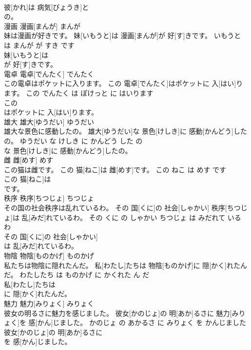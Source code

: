 \documentclass[8pt]{extreport}
\begin{document}
\begin{CJK}{UTF8}{min}
\\	彼[かれ]は 病気[びょうき]と
\\	の。			
\\	漫画	漫画[まんが]	まんが	
\\	妹は漫画が好きです。	妹[いもうと]は 漫画[まんが]が 好[す]きです。	いもうと は まんが が すき です	
\\	妹[いもうと]は
\\	が 好[す]きです。			
\\	電卓	電卓[でんたく]	でんたく	
\\	この電卓はポケットに入ります。	この 電卓[でんたく]はポケットに 入[はい]ります。	この でんたく は ぽけっと に はいります	
\\	この
\\	はポケットに 入[はい]ります。			
\\	雄大	雄大[ゆうだい]	ゆうだい	
\\	雄大な景色に感動したの。	雄大[ゆうだい]な 景色[けしき]に 感動[かんどう]したの。	ゆうだい な けしき に かんどう した の	
\\	な 景色[けしき]に 感動[かんどう]したの。			
\\	雌	雌[めす]	めす	
\\	この猫は雌です。	この 猫[ねこ]は 雌[めす]です。	この ねこ は めす です	
\\	この 猫[ねこ]は
\\	です。			
\\	秩序	秩序[ちつじょ]	ちつじょ	
\\	その国の社会秩序は乱れているわ。	その 国[くに]の 社会[しゃかい] 秩序[ちつじょ]は 乱[みだ]れているわ。	その くに の しゃかい ちつじょ は みだれて いる わ	
\\	その 国[くに]の 社会[しゃかい]
\\	は 乱[みだ]れているわ。			
\\	物陰	物陰[ものかげ]	ものかげ	
\\	私たちは物陰に隠れたんだ。	私[わたし]たちは 物陰[ものかげ]に 隠[かく]れたんだ。	わたしたち は ものかげ に かくれた ん だ	
\\	私[わたし]たちは
\\	に 隠[かく]れたんだ。			
\\	魅力	魅力[みりょく]	みりょく	
\\	彼女の明るさに魅力を感じました。	彼女[かのじょ]の 明[あか]るさに 魅力[みりょく]を 感[かん]じました。	かのじょ の あかるさ に みりょく を かんじました	
\\	彼女[かのじょ]の 明[あか]るさに
\\	を 感[かん]じました。			

\end{CJK}
\end{document}
